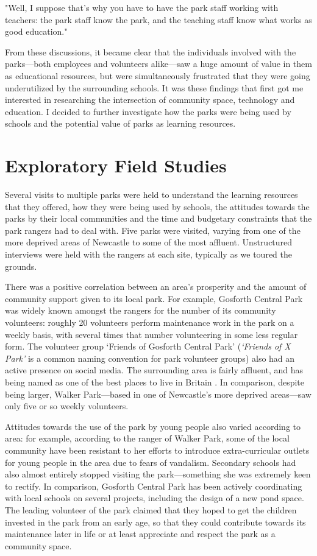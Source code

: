 \begin{displayquote}
"Well, I suppose that's why you have to have the park staff working with teachers: the park staff know the park, and the teaching staff know what works as good education."
\end{displayquote}

From these discussions, it became clear that the individuals involved with the parks---both employees and volunteers alike---saw a huge amount of value in them as educational resources, but were simultaneously frustrated that they were going underutilized by the surrounding schools. It was these findings that first got me interested in researching the intersection of community space, technology and education. I decided to further investigate how the parks were being used by schools and the potential value of parks as learning resources.

\section{Exploratory Field Studies}
Several visits to multiple parks were held to understand the learning resources that they offered, how they were being used by schools, the attitudes towards the parks by their local communities and the time and budgetary constraints that the park rangers had to deal with. Five parks were visited, varying from one of the more deprived areas of Newcastle to some of the most affluent. Unstructured interviews were held with the rangers at each site, typically as we toured the grounds.

There was a positive correlation between an area’s prosperity and the amount of community support given to its local park. For example, Gosforth Central Park was widely known amongst the rangers for the number of its community volunteers: roughly 20 volunteers perform maintenance work in the park on a weekly basis, with several times that number volunteering in some less regular form. The volunteer group `Friends of Gosforth Central Park' (\textit{`Friends of X Park'} is a common naming convention for park volunteer groups) also had an active presence on social media. The surrounding area is fairly affluent, and has being named as one of the best places to live in Britain \citep{TheSundayTimes2015}. In comparison, despite being larger, Walker Park---based in one of Newcastle’s more deprived areas---saw only five or so weekly volunteers. 

Attitudes towards the use of the park by young people also varied according to area: for example, according to the ranger of Walker Park, some of the local community have been resistant to her efforts to introduce extra-curricular outlets for young people in the area due to fears of vandalism. Secondary schools had also almost entirely stopped visiting the park---something she was extremely keen to rectify. In comparison, Gosforth Central Park has been actively coordinating with local schools on several projects, including the design of a new pond space. The leading volunteer of the park claimed that they hoped to get the children invested in the park from an early age, so that they could contribute towards its maintenance later in life or at least appreciate and respect the park as a community space. 

